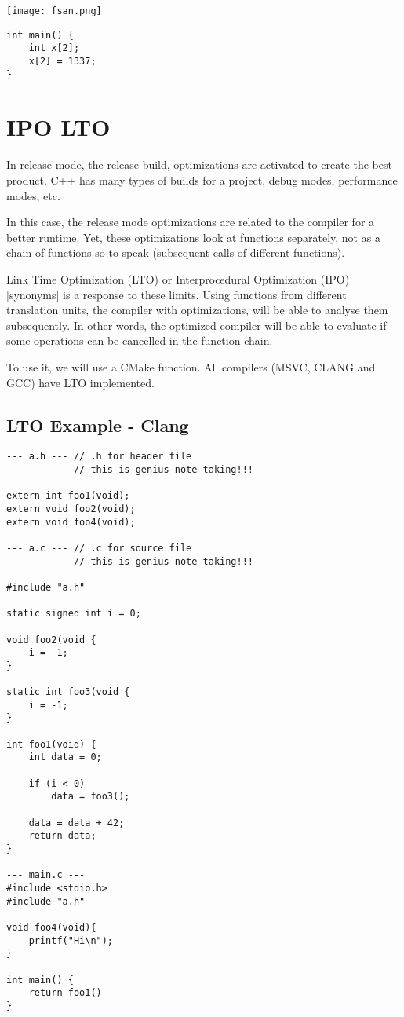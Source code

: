 \documentclass[openany]{report}
\begin{document}
\begin{center}
    \texttt{[image: fsan.png]}
\end{center}


\begin{verbatim}
int main() {
    int x[2];
    x[2] = 1337;
}
\end{verbatim}

\section{IPO LTO}

In release mode, the release build, optimizations are activated to create the best product. C++ has many types of builds
for a project, debug modes, performance modes, etc. 

In this case, the release mode optimizations are related to the compiler for a better runtime. Yet, these optimizations
look at functions separately, not as a chain of functions so to speak (subsequent calls of different functions).

Link Time Optimization (LTO) or Interprocedural Optimization (IPO) [synonyms] is a response to these limits. Using functions from different translation units, the compiler with optimizations,
will be able to analyse them subsequently. In other words, the optimized compiler will be able to evaluate
if some operations can be cancelled in the function chain.

To use it, we will use a CMake function. All compilers (MSVC, CLANG and GCC) have LTO implemented.


\subsection{LTO Example - Clang}

\begin{verbatim}
--- a.h --- // .h for header file
            // this is genius note-taking!!!

extern int foo1(void);
extern void foo2(void);
extern void foo4(void);

--- a.c --- // .c for source file
            // this is genius note-taking!!!

#include "a.h"

static signed int i = 0;

void foo2(void {
    i = -1; 
}

static int foo3(void {
    i = -1; 
}

int foo1(void) {
    int data = 0;

    if (i < 0)
        data = foo3();

    data = data + 42;
    return data;
}

--- main.c ---
#include <stdio.h>
#include "a.h"

void foo4(void){
    printf("Hi\n");
}

int main() {
    return foo1()
}
\end{verbatim}
\end{document}
